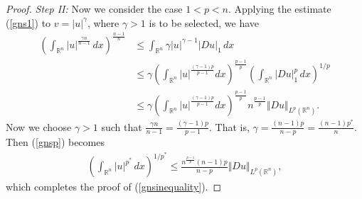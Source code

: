\documentclass{article}
\numberwithin{equation}{section}
\newcommand{\bbR}{\mathbb{R}}
\theoremstyle{plain}
\theoremstyle{definition}
\begin{document}
\begin{proof}
\textit{Step II:} Now we consider the case $1<p<n$. Applying the estimate (\ref{gns1}) to $v=\vert u\vert^{\gamma}$, where $\gamma>1$ is to be selected, we have
\begin{equation}
	\begin{aligned}
		\left(\int_{\bbR^n}\vert u\vert^{\frac{\gamma n}{n-1}}\,dx\right)^{\frac{n-1}{n}}&\leq\int_{\bbR^n}\gamma\vert u\vert^{\gamma-1}\vert Du\vert_1\,dx\\
		&\leq\gamma\left(\int_{\bbR^n}\vert u\vert^{\frac{(\gamma-1)p}{p-1}}dx\right)^{\frac{p-1}{p}}\left(\int_{\bbR^n}\vert Du\vert_1^p\,dx\right)^{1/p}\\
		&\leq\gamma\left(\int_{\bbR^n}\vert u\vert^{\frac{(\gamma-1)p}{p-1}}dx\right)^{\frac{p-1}{p}}n^{\frac{p-1}{p}}\Vert Du\Vert_{L^p(\bbR^n)}.
	\end{aligned}\label{gnsp}
\end{equation}
Now we choose $\gamma>1$ such that $\frac{\gamma n}{n-1}=\frac{(\gamma-1)p}{p-1}$. That is, $\gamma=\frac{(n-1)p}{n-p}=\frac{(n-1)p^*}{n}.$ Then (\ref{gnsp}) becomes
\begin{align*}
	\left(\int_{\bbR^n}\vert u\vert^{p^*}\,dx\right)^{1/p^*}\leq\frac{n^{\frac{p-1}{p}}(n-1)p}{n-p}\Vert Du\Vert_{L^p(\bbR^n)},
\end{align*}
which completes the proof of (\ref{gnsinequality}).
\end{proof}
\end{document}
